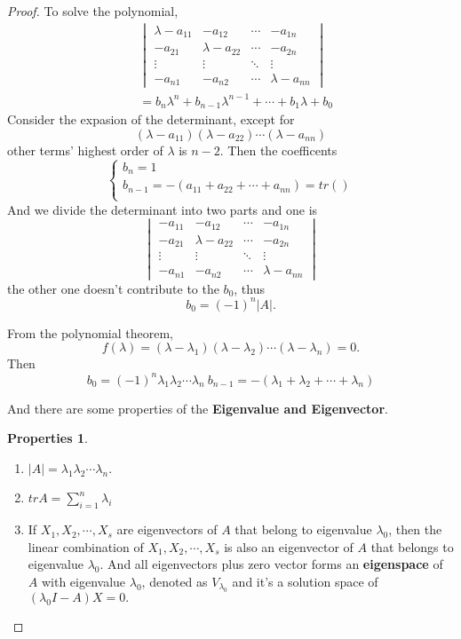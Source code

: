 \documentclass{article}
\theoremstyle{definition}
\newtheorem{pro}{Properties}[section]
\begin{document}
\begin{proof}
To solve the polynomial,
\begin{align*}
    &\begin{vmatrix}
        \lambda-a_{11} & -a_{12} & \cdots & -a_{1n} \\
        -a_{21} & \lambda-a_{22} & \cdots & -a_{2n} \\
        \vdots & \vdots & \ddots & \vdots \\
        -a_{n1} & -a_{n2} & \cdots & \lambda-a_{nn}
    \end{vmatrix}
    \\ & =
    b_{n}\lambda^{n}+b_{n-1}\lambda^{n-1}+\cdots+b_{1}\lambda+b_{0}
\end{align*}
Consider the expasion of the determinant, except for 
$$(\lambda-a_{11})(\lambda-a_{22})\cdots (\lambda-a_{nn})$$ 
other terms' highest order of $\lambda$ is $n-2$.
Then the coefficents
$$\begin{cases}
    b_{n} = 1 \\
    b_{n-1} = -(a_{11}+a_{22}+\cdots+a_{nn}) = tr()\\ 
\end{cases}
$$
And we divide the determinant into two parts and one is 
$$\begin{vmatrix}
    -a_{11} & -a_{12} & \cdots & -a_{1n} \\
    -a_{21} & \lambda-a_{22} & \cdots & -a_{2n} \\
    \vdots & \vdots & \ddots & \vdots \\
    -a_{n1} & -a_{n2} & \cdots & \lambda-a_{nn}
\end{vmatrix}$$
the other one doesn't contribute to the $b_{0}$, thus $$b_{0}=(-1)^{n}|A|.$$

From the polynomial theorem, 
$$f(\lambda)=(\lambda-\lambda_{1})(\lambda-\lambda_{2})\cdots (\lambda-\lambda_{n})=0.$$
Then 
$$b_{0}=(-1)^{n}\lambda_{1}\lambda_{2}\cdots\lambda_{n}\ b_{n-1}=-(\lambda_{1}+\lambda_{2}+\cdots+\lambda_{n})$$

And there are some properties of the \textbf{Eigenvalue and Eigenvector}.
\begin{pro}
\begin{enumerate}
    \item $|A|=\lambda_{1}\lambda_{2}\cdots\lambda_{n}$.
    \item $tr A=\sum_{i=1}^{n}\lambda_{i}$
    \item If $X_{1},X_{2},\cdots,X_{s}$ are eigenvectors of $A$ that belong to eigenvalue $\lambda_{0}$, then
    the linear combination of $X_{1},X_{2},\cdots,X_{s}$ is also an eigenvector of $A$ that belongs to eigenvalue $\lambda_{0}$.
    And all eigenvectors plus zero vector forms an \textbf{eigenspace} of $A$ with eigenvalue $\lambda_{0}$, denoted as $V_{\lambda_{0}}$
    and it's a solution space of $(\lambda_{0}I-A)X=0.$
\end{enumerate}
\end{pro}


\end{proof}
\end{document}
